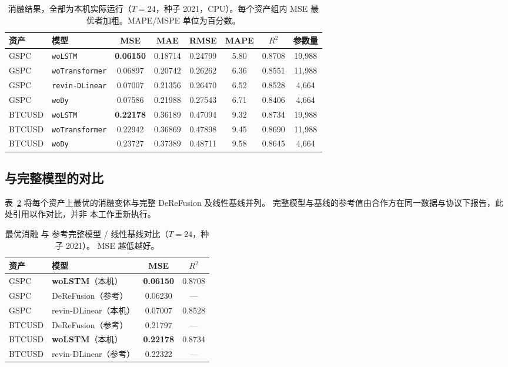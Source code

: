 \documentclass[11pt, a4paper]{ctexart}
\begin{document}
\begin{table}[H]
\centering
\caption{消融结果，全部为本机实际运行（$T{=}24$，种子 2021，CPU）。每个资产组内
MSE 最优者加粗。MAPE/MSPE 单位为百分数。}
\label{tab:main}
\small
\begin{tabular}{llcccccc}
\toprule
资产 & 模型 & MSE & MAE & RMSE & MAPE & $R^2$ & 参数量 \\
\midrule
GSPC   & \texttt{woLSTM}        & \textbf{0.06150} & 0.18714 & 0.24799 & 5.80 & 0.8708 & 19{,}988 \\
GSPC   & \texttt{woTransformer} & 0.06897 & 0.20742 & 0.26262 & 6.36 & 0.8551 & 11{,}988 \\
GSPC   & \texttt{revin-DLinear} & 0.07007 & 0.21356 & 0.26470 & 6.52 & 0.8528 & 4{,}664 \\
GSPC   & \texttt{woDy}          & 0.07586 & 0.21988 & 0.27543 & 6.71 & 0.8406 & 4{,}664 \\
\midrule
BTCUSD & \texttt{woLSTM}        & \textbf{0.22178} & 0.36189 & 0.47094 & 9.32 & 0.8734 & 19{,}988 \\
BTCUSD & \texttt{woTransformer} & 0.22942 & 0.36869 & 0.47898 & 9.45 & 0.8690 & 11{,}988 \\
BTCUSD & \texttt{woDy}          & 0.23727 & 0.37389 & 0.48711 & 9.58 & 0.8645 & 4{,}664 \\
\bottomrule
\end{tabular}
\end{table}

\subsection{与完整模型的对比}

表~\ref{tab:ref} 将每个资产上最优的消融变体与完整 DeReFusion 及线性基线并列。
完整模型与基线的参考值由合作方在同一数据与协议下报告，此处引用以作对比，并非
本工作重新执行。

\begin{table}[H]
\centering
\caption{最优消融 与 参考完整模型 / 线性基线对比（$T{=}24$，种子 2021）。
MSE 越低越好。}
\label{tab:ref}
\begin{tabular}{llcc}
\toprule
资产 & 模型 & MSE & $R^2$ \\
\midrule
GSPC   & \textbf{woLSTM}（本机）      & \textbf{0.06150} & 0.8708 \\
GSPC   & DeReFusion（参考）            & 0.06230 & --- \\
GSPC   & revin-DLinear（本机）         & 0.07007 & 0.8528 \\
\midrule
BTCUSD & DeReFusion（参考）            & 0.21797 & --- \\
BTCUSD & \textbf{woLSTM}（本机）      & \textbf{0.22178} & 0.8734 \\
BTCUSD & revin-DLinear（参考）         & 0.22322 & --- \\
\bottomrule
\end{tabular}
\end{table}
\end{document}
